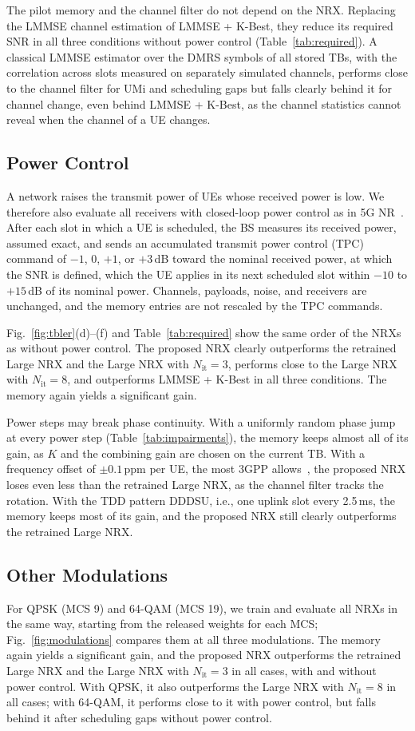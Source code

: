 The pilot memory and the channel filter do not depend on the NRX. Replacing the LMMSE channel estimation of LMMSE + K-Best, they reduce its required SNR in all three conditions without power control (Table~\ref{tab:required}). A classical LMMSE estimator over the DMRS symbols of all stored TBs, with the correlation across slots measured on separately simulated channels, performs close to the channel filter for UMi and scheduling gaps but falls clearly behind it for channel change, even behind LMMSE + K-Best, as the channel statistics cannot reveal when the channel of a UE changes.

\subsection{Power Control}
A network raises the transmit power of UEs whose received power is low. We therefore also evaluate all receivers with closed-loop power control as in 5G NR~\cite{3gpp38213}. After each slot in which a UE is scheduled, the BS measures its received power, assumed exact, and sends an accumulated transmit power control (TPC) command of $-1$, $0$, $+1$, or $+3$\,dB toward the nominal received power, at which the SNR is defined, which the UE applies in its next scheduled slot within $-10$ to $+15$\,dB of its nominal power. Channels, payloads, noise, and receivers are unchanged, and the memory entries are not rescaled by the TPC commands.

Fig.~\ref{fig:tbler}(d)--(f) and Table~\ref{tab:required} show the same order of the NRXs as without power control. The proposed NRX clearly outperforms the retrained Large NRX and the Large NRX with $N_{\mathrm{it}}=3$, performs close to the Large NRX with $N_{\mathrm{it}}=8$, and outperforms LMMSE + K-Best in all three conditions. The memory again yields a significant gain.

Power steps may break phase continuity. With a uniformly random phase jump at every power step (Table~\ref{tab:impairments}), the memory keeps almost all of its gain, as $K$ and the combining gain are chosen on the current TB. With a frequency offset of $\pm 0.1$\,ppm per UE, the most 3GPP allows~\cite{3gpp381011}, the proposed NRX loses even less than the retrained Large NRX, as the channel filter tracks the rotation. With the TDD pattern DDDSU, i.e., one uplink slot every 2.5\,ms, the memory keeps most of its gain, and the proposed NRX still clearly outperforms the retrained Large NRX.

\subsection{Other Modulations}
For QPSK (MCS 9) and 64-QAM (MCS 19), we train and evaluate all NRXs in the same way, starting from the released weights for each MCS; Fig.~\ref{fig:modulations} compares them at all three modulations. The memory again yields a significant gain, and the proposed NRX outperforms the retrained Large NRX and the Large NRX with $N_{\mathrm{it}}=3$ in all cases, with and without power control. With QPSK, it also outperforms the Large NRX with $N_{\mathrm{it}}=8$ in all cases; with 64-QAM, it performs close to it with power control, but falls behind it after scheduling gaps without power control.

